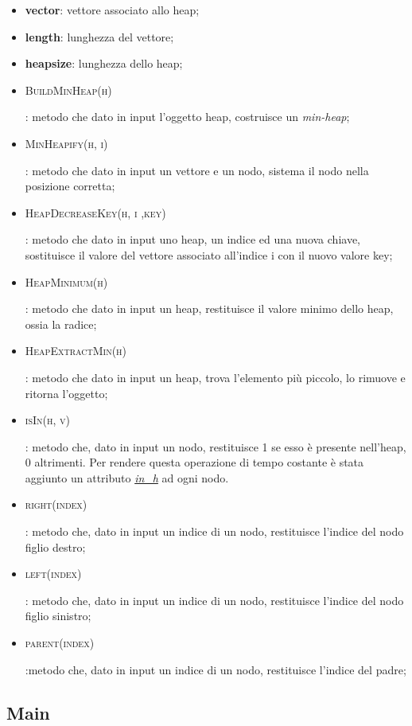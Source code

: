 \begin{itemize}
    \item \textbf{vector}: vettore associato allo heap;
    \item \textbf{length}: lunghezza del vettore;
    \item \textbf{heapsize}: lunghezza dello heap;
    \item \hypertarget{buildminheap}{\textsc{BuildMinHeap(h)}}: metodo che dato in input l'oggetto heap, costruisce un \textit{min-heap};
    \item \hypertarget{minheapify}{\textsc{MinHeapify(h, i)}}: metodo che dato in input un vettore e un nodo, sistema il nodo nella posizione corretta;
    \item \hypertarget{heapdecreasekey}{\textsc{HeapDecreaseKey(h, i ,key)}}: metodo che dato in input uno heap, un indice ed una nuova chiave, sostituisce il valore del vettore associato all'indice i con il nuovo valore key;
    \item \hypertarget{heapminimum}{\textsc{HeapMinimum(h)}}: metodo che dato in input un heap, restituisce il valore minimo dello heap, ossia la radice;
    \item \hypertarget{heapextractmin}{\textsc{HeapExtractMin(h)}}: metodo che dato in input un heap, trova l'elemento più piccolo, lo rimuove e ritorna l'oggetto;
    \item \hypertarget{isin}{\textsc{isIn(h, v)}}: metodo che, dato in input un nodo, restituisce 1 se esso è presente nell'heap, 0 altrimenti. Per rendere questa operazione di tempo costante è stata aggiunto un attributo \hyperlink{inh}{\textit{in\_h}} ad ogni nodo.
    \item \hypertarget{right}{\textsc{right(index)}}: metodo che, dato in input un indice di un nodo, restituisce l'indice del nodo figlio destro;
    \item \hypertarget{left}{\textsc{left(index)}}: metodo che, dato in input un indice di un nodo, restituisce l'indice del nodo figlio sinistro;
    \item \hypertarget{parent}{\textsc{parent(index)}}:metodo che, dato in input un indice di un nodo, restituisce l'indice del padre;
\end{itemize}


\newpage


\subsection{Main}
\label{Main}

